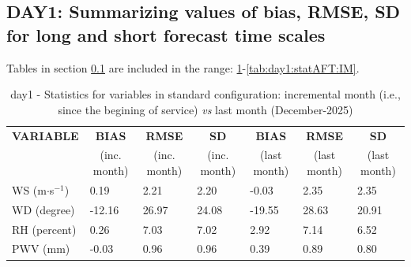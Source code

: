 \subsection{DAY1: Summarizing values of bias, RMSE, SD for long and short forecast time scales}\label{subsec:day1:stat}
Tables in section \ref{subsec:day1:stat} are included in the range: \ref{tab:day1:statBEF}-\ref{tab:day1:statAFT:IM}.
\begin{table}[h!]
\begin{center}
\begin{tabular}{|l|l|l|l|l|l|l|}
\hline
\multicolumn{1}{|c|}{\cellcolor[HTML]{C0C0C0}\textbf{VARIABLE}} & \multicolumn{1}{c|}{\cellcolor[HTML]{C0C0C0}\textbf{BIAS}} & \multicolumn{1}{c|}{\cellcolor[HTML]{C0C0C0}\textbf{RMSE}} & \multicolumn{1}{c|}{\cellcolor[HTML]{C0C0C0}\textbf{SD}} & \multicolumn{1}{c|}{\cellcolor[HTML]{C0C0C0}\textbf{BIAS}} & \multicolumn{1}{c|}{\cellcolor[HTML]{C0C0C0}\textbf{RMSE}} & \multicolumn{1}{c|}{\cellcolor[HTML]{C0C0C0}\textbf{SD}}\\
\multicolumn{1}{|c|}{\cellcolor[HTML]{C0C0C0}} & \multicolumn{1}{c|}{\cellcolor[HTML]{C0C0C0}(inc. month)} & \multicolumn{1}{c|}{\cellcolor[HTML]{C0C0C0}(inc. month)} & \multicolumn{1}{c|}{\cellcolor[HTML]{C0C0C0}(inc. month)} & \multicolumn{1}{c|}{\cellcolor[HTML]{C0C0C0}(last month)} & \multicolumn{1}{c|}{\cellcolor[HTML]{C0C0C0}(last month)} & \multicolumn{1}{c|}{\cellcolor[HTML]{C0C0C0}(last month)}\\\hline
\cellcolor[HTML]{C0C0C0}WS (m$\cdot$s$^{-1}$) &      0.19  &      2.21  &      2.20  &     -0.03     &      2.35     &      2.35\\
\cellcolor[HTML]{C0C0C0}WD (degree)           &    -12.16  &     26.97  &     24.08  &    -19.55     &     28.63     &     20.91\\
\cellcolor[HTML]{C0C0C0}RH (percent)          &      0.26  &      7.03  &      7.02  &      2.92     &      7.14     &      6.52\\
\cellcolor[HTML]{C0C0C0}PWV (mm)              &     -0.03 &      0.96 &      0.96 &      0.39    &      0.89    &      0.80\\
\hline
\end{tabular}
\caption{day1 - Statistics for variables in standard configuration: incremental month (i.e., since the begining of service) \textit{vs} last month (December-2025)}\label{tab:day1:statBEF}
\end{center}
\end{table}

